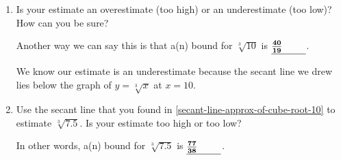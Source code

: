 \documentclass{article}
\begin{document}
\begin{enumerate}
\begin{enumerate}[resume]
\begin{solution}
      The average rate of change between $x=8$ and $x=27$ is $\frac{f(27) - f(8)}{27-8} =
      \frac{3 - 2}{19} = \frac{1}{19}$. This is the slope of the secant line pictured below in red.

      
      We know that the slope of the secant line is $\frac{1}{19}$. Using point-slope formula we can find the equation of the secant line.
      $$y-2 = \frac{1}{19} (x-8)$$
      $$ y = \frac{1}{19}(x-8) +2$$ 
      Now we use the line to estimate $\sqrt[3]{10}$.
      $$\sqrt[3]{10} \approx \frac{1}{19}(10-8) +2$$ 
      $$ \sqrt[3]{10} \approx \frac{2}{19}+2$$
      $$ \sqrt[3]{10} \approx \frac{40}{19} \approx 2.1$$ 
    \end{solution}

  \item


    \begin{problem}[\stretch{0.25}]
      Is your estimate an overestimate (too high) or an underestimate (too low)?  How can you be sure? 
    \end{problem}

    \begin{problem}
      Another way we can say this is that a(n)  bound for $\sqrt[3]{10}$ is 
      $\fitb{0.5in}{\frac{40}{19}}$.
    \end{problem}

    \begin{solution}
      We know our estimate is an underestimate because the secant line we drew
      lies below the graph of $y=\sqrt[3]{x}$ at $x=10$.
    \end{solution}

  \item
    \begin{problem}[\vfill]
      Use the secant line that you found in \ref{secant-line-approx-of-cube-root-10} to estimate $\sqrt[3]{7.5}$. Is your estimate too high or too low? 
    \end{problem}

    \begin{problem}      
      In other words, a(n)  bound for $\sqrt[3]{7.5}$ is $\fitb{0.5in}{\frac{77}{38}}$.
    \end{problem}


\end{enumerate}
\end{enumerate}
\end{document}
